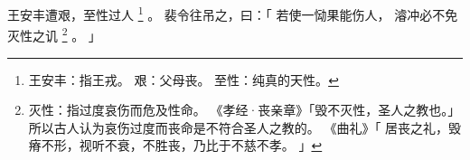 
\switchcolumn*[\section{}]

王安丰遭艰，至性过人%
\footnote{%
    王安丰：指王戎。
    艰：父母丧。
    至性：纯真的天性。
}%
。
裴令往吊之，曰：「
    若使一恸果能伤人，
    濬冲必不免灭性之讥%
    \footnote{%
        灭性：指过度哀伤而危及性命。
              《孝经·丧亲章》「毁不灭性，圣人之教也。」
              所以古人认为哀伤过度而丧命是不符合圣人之教的。
              《曲礼》「
                  居丧之礼，毁瘠不形，视听不衰，不胜丧，乃比于不慈不孝。
              」
    }%
    。
」

\switchcolumn


